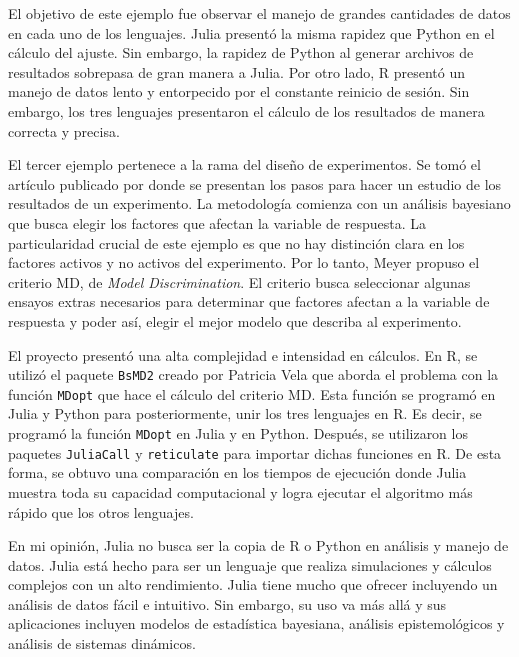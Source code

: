 El objetivo de este ejemplo fue observar el manejo de grandes cantidades de datos en cada uno de los lenguajes. \textsf{Julia} presentó la misma rapidez que \textsf{Python} en el cálculo del ajuste. Sin embargo, la rapidez de \textsf{Python} al generar archivos de resultados sobrepasa de gran manera a \textsf{Julia}. Por otro lado, \textsf{R} presentó un manejo de datos lento y entorpecido por el constante reinicio de sesión. Sin embargo, los tres lenguajes presentaron el cálculo de los resultados de manera correcta y precisa. 

El tercer ejemplo pertenece a la rama del diseño de experimentos. Se tomó el artículo publicado por \cite{meyer1996} donde se presentan los pasos para hacer un estudio de los resultados de un experimento. La metodología comienza con un análisis bayesiano que busca elegir los factores que afectan la variable de respuesta. La particularidad crucial de este ejemplo es que no hay distinción clara en los factores activos y no activos del experimento. Por lo tanto, Meyer propuso el criterio MD, de \textit{Model Discrimination}. El criterio busca seleccionar algunas ensayos extras necesarios para determinar que factores afectan a la variable de respuesta y poder así, elegir el mejor modelo que describa al experimento. 

El proyecto presentó una alta complejidad e intensidad en cálculos. En \textsf{R}, se utilizó el paquete \texttt{BsMD2} creado por Patricia Vela que aborda el problema con la función \texttt{MDopt} que hace el cálculo del criterio MD. Esta función se programó en \textsf{Julia} y \textsf{Python} para posteriormente, unir los tres lenguajes en \textsf{R}. Es decir, se programó la función \texttt{MDopt} en \textsf{Julia} y en \textsf{Python}. Después, se utilizaron los paquetes \texttt{JuliaCall} y \texttt{reticulate} para importar dichas funciones en \textsf{R}. De esta forma, se obtuvo una comparación en los tiempos de ejecución donde \textsf{Julia} muestra toda su capacidad computacional y logra ejecutar el algoritmo más rápido que los otros lenguajes. 

En mi opinión, \textsf{Julia} no busca ser la copia de \textsf{R} o \textsf{Python} en análisis y manejo de datos. \textsf{Julia} está hecho para ser un lenguaje que realiza simulaciones y cálculos complejos con un alto rendimiento. \textsf{Julia} tiene mucho que ofrecer incluyendo un análisis de datos fácil e intuitivo. Sin embargo, su uso va más allá y sus aplicaciones incluyen modelos de estadística bayesiana, análisis epistemológicos y análisis de sistemas dinámicos. 

